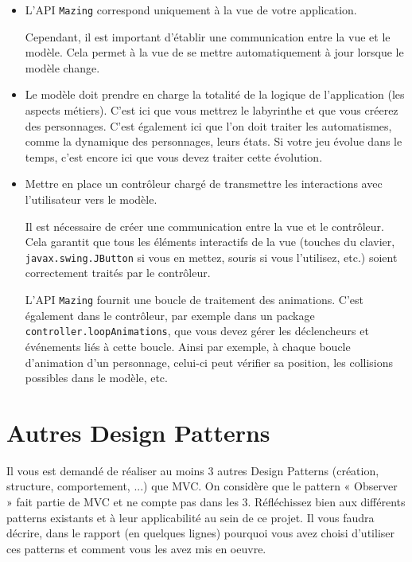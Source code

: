 \documentclass{article}
\newcommand{\code}[1]{\lstinline{#1}}
\begin{document}
\begin{itemize}
    \item L'API \texttt{Mazing} correspond uniquement à la vue de votre application.

        Cependant, il est important d'établir une communication entre la vue et le modèle. Cela permet 
        à la vue de se mettre automatiquement à jour lorsque le modèle change.

    \item Le modèle doit prendre en charge la totalité de la logique de l'application (les aspects métiers). 
    C'est ici que vous mettrez le labyrinthe et que vous créerez des personnages. 
    C'est également ici que l'on doit traiter les automatismes, comme la dynamique des personnages, leurs états.
    Si votre jeu évolue dans le temps, c'est encore ici que vous devez traiter cette évolution.
    
    \item Mettre en place un contrôleur chargé de transmettre les interactions avec l'utilisateur vers le modèle.

            Il est nécessaire de créer une communication entre la vue et le contrôleur. 
        Cela garantit que tous les éléments interactifs de la vue (touches du clavier, 
        \code{javax.swing.JButton} si vous en mettez, souris si vous l'utilisez, etc.) soient correctement traités par le contrôleur.

        L'API \texttt{Mazing} fournit une boucle de traitement des animations. C'est également dans le contrôleur, 
        par exemple dans un package \code{controller.loopAnimations}, que vous devez gérer les déclencheurs et événements liés à cette boucle.
        Ainsi par exemple, à chaque boucle d'animation d'un personnage, celui-ci peut vérifier sa position, les collisions possibles dans le modèle, etc.

\end{itemize}

\section*{Autres Design Patterns}

Il vous est demandé de réaliser au moins 3 autres Design Patterns (création, structure, comportement, ...) que MVC. 
On considère que le pattern « Observer » fait partie de MVC et ne compte pas dans les 3.
Réfléchissez bien aux différents patterns existants et à leur applicabilité au sein de ce projet.
Il vous faudra décrire, dans le rapport (en quelques lignes) pourquoi vous avez choisi d’utiliser ces patterns 
et comment vous les avez mis en oeuvre.
\end{document}

